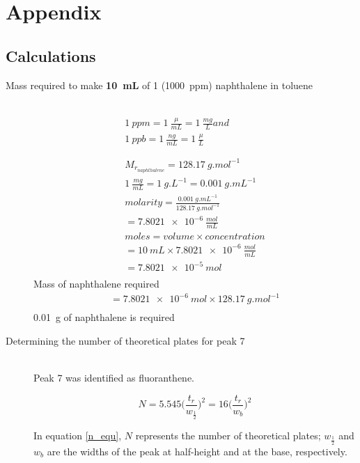 \documentclass[a4paper, 12pt]{article}
\begin{document}
\section{Appendix}

\subsection{Calculations}

\begin{description}
\item[Mass required to make \textbf{\SI{10}{mL}} of \SI{1}{} (\SI{1000}{ppm}) naphthalene in toluene] \hfill \\
\begin{gather*}
	\SI{1}{ppm} = \SI{1}{\frac{\mu}{mL}} = \SI{1}{\frac{mg}{L}} and \\
	\SI{1}{ppb} = \SI{1}{\frac{ng}{mL}} = \SI{1}{\frac{\mu}{L}} \\
	\\
	\\
	M_{r_{naphthalene}} = \SI{128.17}{g.mol^{-1}} \\
	\SI{1}{\frac{mg}{mL}} = \SI{1}{g.L^{-1}} = \SI{0.001}{g.mL^{-1}} \\
	molarity = \frac{\SI{0.001}{g.mL^{-1}}}{\SI{128.17}{g.mol^{-1}}} \\
	= \SI{7.8021e-6}{\frac{mol}{mL}} \\
	moles = volume \times concentration \\
	= \SI{10}{mL} \times \SI{7.8021e-6}{\frac{mol}{mL}} \\
	= \SI{7.8021e-5}{mol} \\
\end{gather*}
	Mass of naphthalene required 
\begin{gather*}
= \SI{7.8021e-6}{mol} \times \SI{128.17}{g.mol^{-1}} \\
\end{gather*}
\SI{0.01}{g} of naphthalene is required

\item[Determining the number of theoretical plates for peak 7] \hfill \\
	Peak 7 was identified as fluoranthene.

	\begin{equation} \label{n_equ}
		N = 5.545\Bigg(\frac{t_r}{w_\frac{1}{2}}\Bigg)^2 = 16\Bigg(\frac{t_r}{w_b}\Bigg)^2
	\end{equation}

	In equation \ref{n_equ}, \(N\) represents the number of theoretical plates; \(w_\frac{1}{2}\) and \(w_b\) are the widths of the peak at half-height and at the base, respectively.


\end{description}
\end{document}
